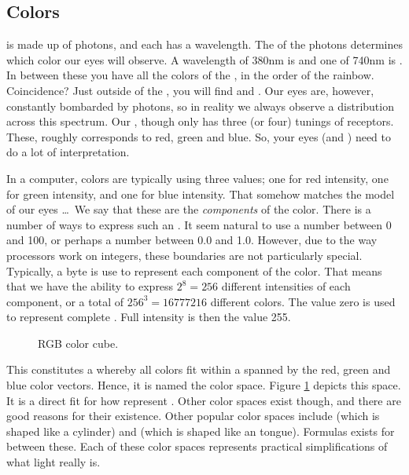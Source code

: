 \subsection{Colors}

 is made up of photons, and each  has a wavelength. The  of the photons determines which color our eyes will observe. A wavelength of 380nm is  and one of 740nm is . In between these you have all the colors of the , in the order of the rainbow. Coincidence? Just outside of the , you will find  and . Our eyes are, however, constantly bombarded by photons, so in reality we always observe a distribution across this spectrum. Our , though only has three (or four) tunings of receptors. These, roughly corresponds to red, green and blue. So, your eyes (and ) need to do a lot of interpretation.

In a computer, colors are typically  using three values; one for red intensity, one for green intensity, and one for blue intensity. That somehow matches the model of our eyes \ldots\ We say that these are the \textsl{components} of the color. There is a number of ways to express such an . It seem natural to use a number between 0 and 100, or perhaps a number between 0.0 and 1.0. However, due to the way processors work on integers, these boundaries are not particularly special. Typically, a byte is use to represent each component of the color. That means that we have the ability to express $2^8=256$ different intensities of each component, or a total of $256^3=16777216$ different colors. The value zero is used to represent complete . Full intensity is then the value 255.

\begin{figure}[tbp]
  
  \caption{RGB color cube.}
  \label{fig:primdata:struct:color}
\end{figure}

This constitutes a  whereby all colors fit within a  spanned by the red, green and blue color vectors. Hence, it is named the  color space. Figure \ref{fig:primdata:struct:color} depicts this space. It is a direct fit for how  represent . Other color spaces exist though, and there are good reasons for their existence. Other popular color spaces include  (which is shaped like a cylinder) and  (which is shaped like an tongue). Formulas exists for  between these. Each of these color spaces represents practical simplifications of what light really is.

